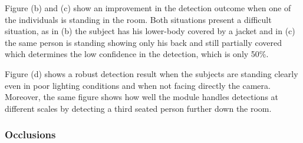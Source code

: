 Figure (b) and (c) show an improvement in the detection outcome when one of the individuals is standing in the room. Both situations present a difficult situation, as in (b) the subject has his lower-body covered by a jacket and in (c) the same person is standing showing only his back and still partially covered which determines the low confidence in the detection, which is only 50\%.

Figure (d) shows a robust detection result when the subjects are standing clearly even in poor lighting conditions and when not facing directly the camera. Moreover, the same figure shows how well the module handles detections at different scales by detecting a third seated person further down the room.

\subsubsection{Occlusions}

